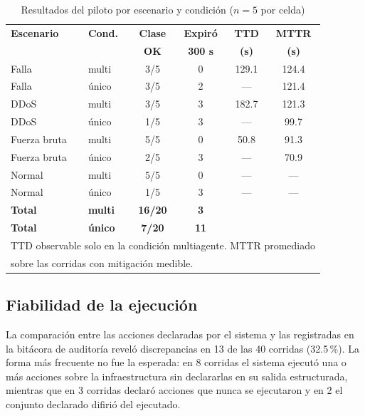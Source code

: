 \documentclass[conference]{IEEEtran}
\begin{document}
\begin{table}[htbp]
\caption{Resultados del piloto por escenario y condición ($n=5$ por celda)}
\begin{center}
\footnotesize
\setlength{\tabcolsep}{3.2pt}
\begin{tabular}{@{}llcccc@{}}
\toprule
\textbf{Escenario} & \textbf{Cond.} & \textbf{Clase} & \textbf{Expiró} &
\textbf{TTD} & \textbf{MTTR} \\
 & & \textbf{OK} & \textbf{300 s} & \textbf{(s)} & \textbf{(s)} \\
\midrule
Falla        & multi  & 3/5 & 0 & 129.1 & 124.4 \\
Falla        & único  & 3/5 & 2 & ---   & 121.4 \\
DDoS         & multi  & 3/5 & 3 & 182.7 & 121.3 \\
DDoS         & único  & 1/5 & 3 & ---   & 99.7 \\
Fuerza bruta & multi  & 5/5 & 0 & 50.8  & 91.3 \\
Fuerza bruta & único  & 2/5 & 3 & ---   & 70.9 \\
Normal       & multi  & 5/5 & 0 & ---   & --- \\
Normal       & único  & 1/5 & 3 & ---   & --- \\
\midrule
\textbf{Total} & \textbf{multi} & \textbf{16/20} & \textbf{3} & & \\
\textbf{Total} & \textbf{único} & \textbf{7/20}  & \textbf{11} & & \\
\bottomrule
\multicolumn{6}{l}{\scriptsize TTD observable solo en la condición multiagente. MTTR
promediado} \\
\multicolumn{6}{l}{\scriptsize sobre las corridas con mitigación medible.} \\
\end{tabular}
\label{tab:resultados}
\end{center}
\end{table}

\subsection{Fiabilidad de la ejecución}
La comparación entre las acciones declaradas por el sistema y las registradas en la
bitácora de auditoría reveló discrepancias en 13 de las 40 corridas (32.5\,\%). La
forma más frecuente no fue la esperada: en 8 corridas el sistema ejecutó una o más
acciones sobre la infraestructura sin declararlas en su salida estructurada, mientras
que en 3 corridas declaró acciones que nunca se ejecutaron y en 2 el conjunto
declarado difirió del ejecutado.
\end{document}

